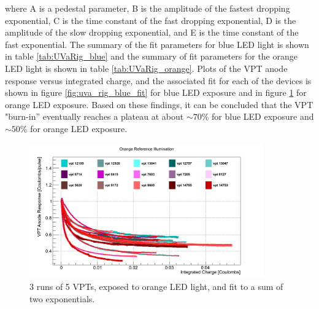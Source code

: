 \noindent where A is a pedestal parameter, B is the amplitude of the
fastest dropping exponential, C is the time constant of the fast
dropping exponential, D is the amplitude of the slow dropping
exponential, and E is the time constant of the fast exponential.  The
summary of the fit parameters for blue LED light is shown in table
\ref{tab:UVaRig_blue} and the summary of fit parameters for the orange
LED light is shown in table \ref{tab:UVaRig_orange}.  Plots of the VPT
anode response versus integrated charge, and the associated fit for
each of the devices is shown in figure \ref{fig:uva_rig_blue_fit} for
blue LED exposure and in figure \ref{fig:uva_rig_orange_fit} for
orange LED exposure.  Based on these findings, it can be concluded
that the VPT "burn-in'' eventually reaches a plateau at about
$\sim70\%$ for blue LED exposure and $\sim50\%$ for orange LED
exposure.  

\begin{figure}[h]
   \centering
  \includegraphics[width=0.9\textwidth]{Figures/CMS_Diagrams/UVaRig__all_good_runs_Overlay___orange_reference_anode__vs__integrated_charge__rolling_average_of_10pts__normalized_to_start_of_run__fitted_with_Double_Exponential.png}
  \caption{3 runs of 5 VPTs, exposed to orange LED light, and fit to a
    sum of two exponentials. } \label{fig:uva_rig_orange_fit}
\end{figure}

